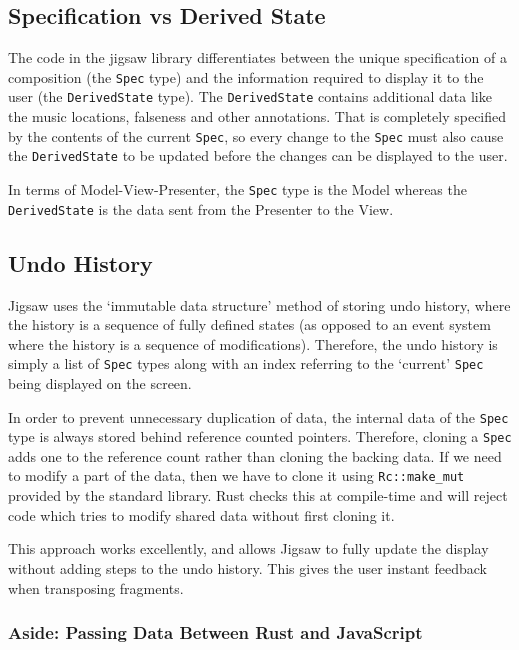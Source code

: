 \documentclass[12pt]{article}
\begin{document}
\subsection{Specification vs Derived State}

The code in the jigsaw library differentiates between the unique specification of a composition
(the \verb|Spec| type) and the information required to display it to the user (the
\verb|DerivedState| type).  The \verb|DerivedState| contains additional data like the music
locations, falseness and other annotations.  That is completely specified by the contents of the
current \verb|Spec|, so every change to the \verb|Spec| must also cause the \verb|DerivedState| to
be updated before the changes can be displayed to the user.

In terms of Model-View-Presenter, the \verb|Spec| type is the Model whereas the \verb|DerivedState|
is the data sent from the Presenter to the View.

\subsection{Undo History}

Jigsaw uses the `immutable data structure' method of storing undo history, where the history is a
sequence of fully defined states (as opposed to an event system where the history is a sequence of
modifications).  Therefore, the undo history is simply a list of \verb|Spec| types along with an
index referring to the `current' \verb|Spec| being displayed on the screen.

In order to prevent unnecessary duplication of data, the internal data of the \verb|Spec| type is
always stored behind reference counted pointers.  Therefore, cloning a \verb|Spec| adds one to the
reference count rather than cloning the backing data.  If we need to modify a part of the data, then
we have to clone it using \verb|Rc::make_mut| provided by the standard library.  Rust checks this
at compile-time and will reject code which tries to modify shared data without first cloning it.

This approach works excellently, and allows Jigsaw to fully update the display without adding steps
to the undo history.  This gives the user instant feedback when transposing fragments.

\subsubsection{Aside: Passing Data Between Rust and JavaScript}
\end{document}
